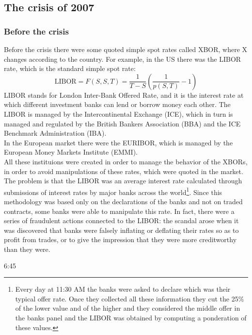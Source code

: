 \subsection{The crisis of 2007}
\subsubsection{Before the crisis}
Before the crisis there were some quoted simple spot rates called XBOR, where X changes according to the country. For example, in the US there was the LIBOR rate, which is the standard simple spot rate:
\begin{equation}
    \text{LIBOR} = F(S,S,T) = \frac{1}{T-S}\left(\frac{1}{p(S,T)}-1\right)
\end{equation}
LIBOR stands for London Inter-Bank Offered Rate, and it is the interest rate at which different investment banks can lend or borrow money each other. The LIBOR is managed by the Intercontinental Exchange (ICE), which in turn is managed and regulated by the British Bankers Association (BBA) and the ICE Benchmark Administration (IBA).\\
In the European market there were the EURIBOR, which is managed by the European Money Markets Institute (EMMI).\\
All these instituions were created in order to manage the behavior of the XBORs, in order to avoid manipulations of these rates, which were quoted in the market. The problem is that the LIBOR was an average interest rate calculated through submissions of interest rates by major banks across the world\footnote{Every day at 11:30 AM the banks were asked to declare which was their typical offer rate. Once they collected all these information they cut the 25\% of the lower value and of the higher and they considered the middle offer in the banks panel and the LIBOR was obtained by computing a ponderation of these values.}. Since this methodology was based only on the declarations of the banks and not on traded contracts, some banks were able to manipulate this rate. In fact, there were a series of fraudulent actions connected to the LIBOR: the scandal arose when it was discovered that banks were falsely inflating or deflating their rates so as to profit from trades, or to give the impression that they were more creditworthy than they were.

6:45
